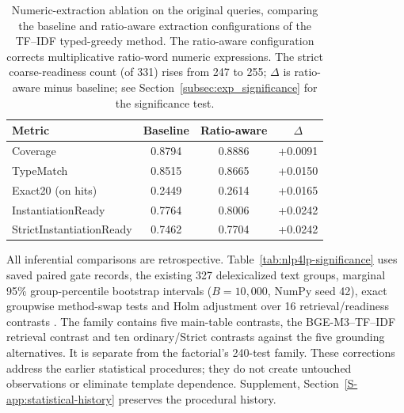 \documentclass[pdflatex,sn-basic,Numbered]{sn-jnl}
\begin{document}
\begin{table}[t]
  \centering
  \caption{Numeric-extraction ablation on the original queries, comparing the baseline and ratio-aware extraction configurations of the TF--IDF typed-greedy method. The ratio-aware configuration corrects multiplicative ratio-word numeric expressions. The strict coarse-readiness count (of 331) rises from 247 to 255; $\Delta$ is ratio-aware minus baseline; see Section~\ref{subsec:exp_significance} for the significance test.}
  \label{tab:nlp4lp-prefix-postfix}
  \small
  \setlength{\tabcolsep}{4pt}
  \begin{tabular}{lccc}
    \toprule
    Metric & Baseline & Ratio-aware & $\Delta$ \\
    \midrule
Coverage & 0.8794 & 0.8886 & +0.0091 \\
TypeMatch & 0.8515 & 0.8665 & +0.0150 \\
Exact20 (on hits) & 0.2449 & 0.2614 & +0.0165 \\
InstantiationReady & 0.7764 & 0.8006 & +0.0242 \\
StrictInstantiationReady & 0.7462 & 0.7704 & +0.0242 \\
    \bottomrule
  \end{tabular}
\end{table}
All inferential comparisons are retrospective. Table~\ref{tab:nlp4lp-significance} uses saved paired gate records, the existing 327 delexicalized text groups, marginal 95\% group-percentile bootstrap intervals ($B=10{,}000$, NumPy seed 42), exact groupwise method-swap tests and Holm adjustment over 16 retrieval/readiness contrasts \cite{holm1979followup}. The family contains five main-table contrasts, the BGE-M3--TF--IDF retrieval contrast and ten ordinary/Strict contrasts against the five grounding alternatives. It is separate from the factorial's 240-test family. These corrections address the earlier statistical procedures; they do not create untouched observations or eliminate template dependence. Supplement, Section~\ref{S-app:statistical-history} preserves the procedural history.
\end{document}

